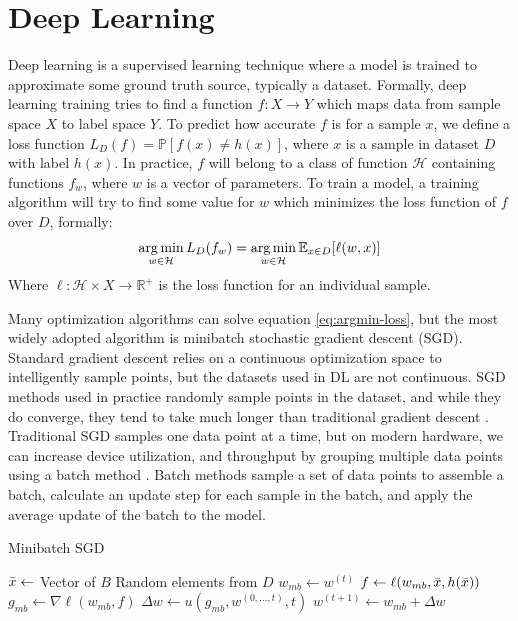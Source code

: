 \section{Deep Learning}
Deep learning is a supervised learning technique where a model is trained to approximate some ground truth source, typically a dataset.
Formally, deep learning training tries to find a function $f: X\longrightarrow Y$ which maps data from sample space $X$ to label space $Y$.
To predict how accurate $f$ is for a sample $x$, we define a loss function $L_D(f)=\mathbb{P}[f(x)\neq h(x)]$, where $x$ is a sample in dataset $D$ with label $h(x)$.
In practice, $f$ will belong to a class of function $\mathcal{H}$ containing functions $f_w$, where $w$ is a vector of parameters.
To train a model, a training algorithm will try to find some value for $w$ which minimizes the loss function of $f$ over $D$, formally:
\begin{equation}
    \operatorname*{arg\,min}_{w\in\mathcal{H}} L_D(f_w) = \operatorname*{arg\,min}_{w\in\mathcal{H}} \mathbb{E}_{x\in D}[\ell (w,x)]
    \label{eq:argmin-loss}
\end{equation} 
Where $\ell:\mathcal{H}\times X\longrightarrow \mathbb{R}^+$ is the loss function for an individual sample. 

Many optimization algorithms can solve equation \ref{eq:argmin-loss}, but the most widely adopted algorithm is minibatch stochastic gradient descent (SGD).
Standard gradient descent relies on a continuous optimization space to intelligently sample points, but the datasets used in DL are not continuous.
SGD methods used in practice randomly sample points in the dataset, and while they do converge, they tend to take much longer than traditional gradient descent \cite{Robbins1951StochasticAproxmethod}.
Traditional SGD samples one data point at a time, but on modern hardware, we can increase device utilization, and throughput by grouping multiple data points using a batch method \cite{Le2011OnOptMethodsforDL}.
Batch methods sample a set of data points to assemble a batch, calculate an update step for each sample in the batch, and apply the average update of the batch to the model. 

\begin{algorithm}
    \caption{Minibatch SGD}
    \label{alg:MinibatchSGD}
    \begin{algorithmic}[1]
         
        \State $\Bar{x}\leftarrow$ Vector of $B$ Random elements from $D$ 
        \State $w_{mb}\leftarrow w^{(t)}$ 
        \State $f\leftarrow \ell(w_{mb},\Bar{x},h(\Bar{x}))$ 
        \State $g_{mb}\leftarrow \nabla \ell(w_{mb}, f)$ 
        \State $\Delta w \leftarrow u(g_{mb}, w^{(0,...,t)}, t)$ 
        \State $w^{(t+1)}\leftarrow w_{mb} + \Delta w$ 
        \EndFor
    \end{algorithmic}
\end{algorithm}

